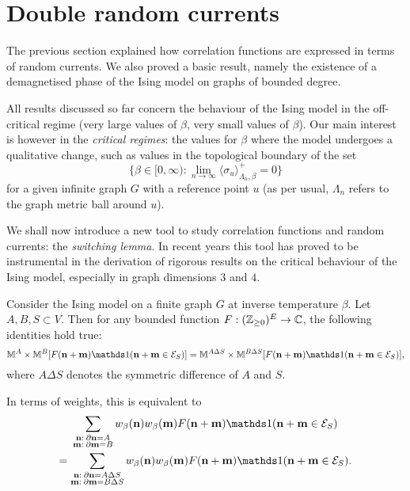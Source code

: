 \section{Double random currents}

The previous section explained how correlation functions are expressed
in terms of random currents.
We also proved a basic result, namely the existence of a demagnetised phase
of the Ising model on graphs of bounded degree.

All results discussed so far concern the behaviour of the Ising model
in the off-critical regime (very large values of $\beta$, very small values of $\beta$).
Our main interest is however in the \emph{critical regimes}:
the values for $\beta$ where the model undergoes a qualitative change,
such as values in the topological boundary of the set
\[
    \{\beta\in[0,\infty):\lim_{n\to\infty}\langle\sigma_u\rangle_{\Lambda_n,\beta}^+=0\}
\]
for a given infinite graph $G$ with a reference point $u$
(as per usual, $\Lambda_n$ refers to the graph metric ball around $u$).

We shall now introduce a new tool to study correlation functions
and random currents: the \emph{switching lemma}.
In recent years this tool has proved to be instrumental in the derivation
of rigorous results on the critical
behaviour of the Ising model, especially in graph dimensions $3$ and $4$.

\begin{lemma}
    Consider the Ising model on a finite graph $G$ at inverse temperature $\beta$.
    Let $A,B,S\subset V$.
    Then for any bounded function $F:(\mathbb Z_{\geq 0})^E\to\mathbb C$,
    the following identities hold true:
    \[
        \M^A\times \M^B[F(\n+\m)\true{\n+\m\in\calE_S}]
        =
        \M^{A\Delta S}\times \M^{B\Delta S}[F(\n+\m)\true{\n+\m\in\calE_S}],
    \]
    where $A\Delta S$ denotes the symmetric difference of $A$ and $S$.

    In terms of weights, this is equivalent to
    \begin{multline}
        \sum_{\substack{\n:\:\partial\n=A\\\m:\:\partial\m=B}}
        w_\beta(\n)w_\beta(\m)
        F(\n+\m)\true{\n+\m\in\calE_S}
        \\
        =
        \sum_{\substack{\n:\:\partial\n=A\Delta S\\\m:\:\partial\m=B\Delta S}}
        w_\beta(\n)w_\beta(\m)
        F(\n+\m)\true{\n+\m\in\calE_S}.
    \end{multline}
\end{lemma}

